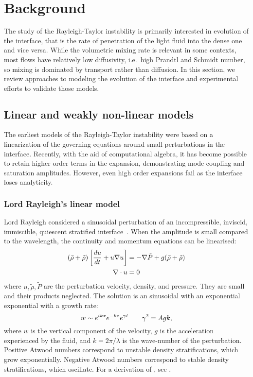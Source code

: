 \chapter{Background}

The study of the Rayleigh-Taylor instability is primarily interested in evolution of the interface, that is the rate of penetration of the light fluid into the dense one and vice versa.
While the volumetric mixing rate is relevant in some contexts, most flows have relatively low diffusivity, i.e.\ high Prandtl and Schmidt number, so mixing is dominated by transport rather than diffusion.
In this section, we review approaches to modeling the evolution of the interface and experimental efforts to validate those models.

\section{Linear and weakly non-linear models} %

The earliest models of the Rayleigh-Taylor instability were based on a linearization of the governing equations around small perturbations in the interface.
Recently, with the aid of computational algebra, it has become possible to retain higher order terms in the expansion, demonstrating mode coupling and saturation amplitudes.
However, even high order expansions fail as the interface loses analyticity.

\subsection{Lord Rayleigh's linear model}

Lord Rayleigh considered a sinusoidal perturbation of an incompressible, inviscid, immiscible, quiescent stratified interface~\cite{Rayleigh1883}.
When the amplitude is small compared to the wavelength, the continuity and momentum equations can be linearised:
\begin{align}
\left(\bar\rho + \tilde\rho\right) \left[\frac{d u}{d t} + u \nabla u \right] &= - \nabla{\tilde{P}} + g(\bar\rho + \tilde\rho)\\
\nabla \cdot u &= 0 \\
\end{align}
where $u, \tilde\rho, \tilde{P}$ are the perturbation velocity, density, and pressure.
They are small and their products neglected.
The solution is an sinusoidal with an exponential exponential with a growth rate:
\begin{equation} \elabel{simple_growth}
	w \sim e^{i k x} e^{-k z} e^{\gamma t} \qquad  \gamma^2 = A g k,
\end{equation}
where $w$ is the vertical component of the velocity, 
$g$ is the acceleration experienced by the fluid, and
$k = 2 \pi / \lambda$ is the wave-number of the perturbation.
Positive Atwood numbers correspond to unstable density stratifications, which grow exponentially.
Negative Atwood numbers correspond to stable density stratifications, which oscillate.
For a derivation of , see .

